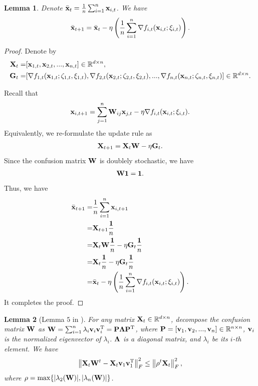 \documentclass{article}
\newtheorem{Lemma}{\bf{Lemma}}
\begin{document}
\begin{Lemma}
\label{Lemma_average_update_rule}
Denote $\bar{{\bf x}}_t = \frac{1}{n}\sum_{i=1}^n {\bf x}_{i,t}$. We have
\begin{align}
\nonumber
\bar{{\bf x}}_{t+1} =  \bar{{\bf x}}_{t} - \eta \left( \frac{1}{n} \sum_{i=1}^n \nabla f_{i,t}({\bf x}_{i,t};\xi_{i,t}) \right). 
\end{align}
\end{Lemma}
\begin{proof}
Denote by
\begin{align}
\nonumber
{\bf X}_t = &  [{\bf x}_{1,t}, {\bf x}_{2,t}, ..., {\bf x}_{n,t}] \in \mathbb{R}^{d\times n}, \\ \nonumber
{\bf G}_t = & [\nabla f_{1,t}({\bf x}_{1,t};\zeta_{1,t},\xi_{1,t}), \nabla f_{2,t}({\bf x}_{2,t};\zeta_{2,t},\xi_{2,t}), ..., \nabla f_{n,t}({\bf x}_{n,t};\zeta_{n,t},\xi_{n,t})] \in \mathbb{R}^{d\times n}.
\end{align}

Recall that 
\begin{align}
\nonumber
{\bf x}_{i,t+1} = \sum_{j=1}^n {\bf W}_{ij}{\bf x}_{j,t} - \eta \nabla f_{i,t}({\bf x}_{i,t};\xi_{i,t}).
\end{align} Equivalently, we re-formulate the update rule as
\begin{align}
\nonumber
{\bf X}_{t+1} = {\bf X}_{t}{\bf W} - \eta {\bf G}_t.
\end{align} Since the confusion matrix ${\bf W}$ is doublely stochastic, we have
\begin{align}
\nonumber
{\bf W} {\bf 1} = {\bf 1}.
\end{align} Thus, we have
\begin{align}
\nonumber
\bar{{\bf x}}_{t+1} = & \frac{1}{n}\sum_{i=1}^n {\bf x}_{i,t+1} \\ \nonumber
= & {\bf X}_{t+1}\frac{{\bf 1}}{n} \\ \nonumber 
= & {\bf X}_{t}{\bf W}\frac{{\bf 1}}{n} - \eta {\bf G}_t\frac{{\bf 1}}{n} \\ \nonumber
= & {\bf X}_{t}\frac{{\bf 1}}{n} - \eta {\bf G}_t\frac{{\bf 1}}{n} \\ \nonumber
=& \bar{{\bf x}}_{t} - \eta \left( \frac{1}{n} \sum_{i=1}^n \nabla f_{i,t}({\bf x}_{i,t};\xi_{i,t}) \right). 
\end{align} It completes the proof.
\end{proof}

\begin{Lemma}[Lemma $5$ in \citep{Tang:2018un}]
\label{Lemma_hanlin_1}
For any matrix ${\bf X}_t\in\mathbb{R}^{d\times n}$, decompose the confusion matrix ${\bf W}$ as ${\bf W} = \sum_{i=1}^n \lambda_i {\bf v}_i {\bf v}_i^{\rm T} = {\bf P} \mathbf{\Lambda} {\bf P}^{\rm T}$, where ${\bf P} = [{\bf v}_1, {\bf v}_2, ..., {\bf v}_n]\in\mathbb{R}^{n\times n}$, ${\bf v}_i$ is the normalized eigenvector of $\lambda_i$. $\mathbf{\Lambda}$ is a diagonal matrix, and $\lambda_i$ be its $i$-th element. We have
\begin{align}
\nonumber
\left\lVert{\bf X}_t {\bf W}^t - {\bf X}_t {\bf v}_1 {\bf v}_1^{\rm T} \right\rVert_F^2 \le \left\lVert\rho^t {\bf X}_t\right\rVert_F^2, 
\end{align} where  $\rho = \max \{| \lambda_2({\bf W}) |, | \lambda_n({\bf W}) |\}$. 

\end{Lemma}
\end{document}
